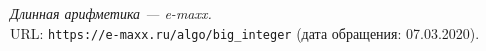 \begin{thebibliography}{99}

{\itshape Длинная арифметика — e-maxx.} \\URL: \texttt{https://e-maxx.ru/algo/big\_integer} (дата обращения: 07.03.2020).

\end{thebibliography}
\pagebreak


